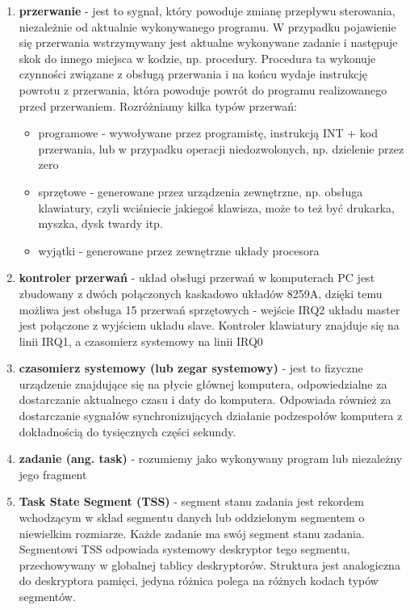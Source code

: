 \documentclass[a4paper,12pt]{article}
\begin{document}
\begin{enumerate}
	\item{\textbf{przerwanie} - jest to sygnał, który powoduje zmianę przepływu sterowania, niezależnie od aktualnie wykonywanego programu. W przypadku pojawienie się przerwania wstrzymywany jest aktualne wykonywane zadanie i następuje skok do innego miejsca w kodzie, np. procedury. Procedura ta wykonuje czynności związane z obsługą przerwania i na końcu wydaje instrukcję powrotu z przerwania, która powoduje powrót do programu realizowanego przed przerwaniem.
Rozróżniamy kilka typów przerwań:}
\begin{itemize}
\item{programowe - wywoływane przez programistę, instrukcją INT + kod przerwania, lub w przypadku operacji niedozwolonych, np. dzielenie przez zero}
\item{sprzętowe - generowane przez urządzenia zewnętrzne, np. obsługa klawiatury, czyli wciśniecie jakiegoś klawisza, może to też być drukarka, myszka, dysk twardy itp.}
\item{wyjątki - generowane przez zewnętrzne układy procesora}
\end{itemize}

\item{\textbf{kontroler przerwań} - układ obsługi przerwań w komputerach PC jest zbudowany z dwóch połączonych kaskadowo układów 8259A, dzięki temu możliwa jest obsługa 15 przerwań sprzętowych - wejście IRQ2 układu master jest połączone z wyjściem układu slave. Kontroler klawiatury znajduje się na linii IRQ1, a czasomierz systemowy na linii IRQ0}
				\item{\textbf{czasomierz systemowy (lub zegar systemowy)} - jest to fizyczne urządzenie znajdujące się na płycie głównej komputera, odpowiedzialne za dostarczanie aktualnego czasu i daty do komputera. Odpowiada również za dostarczanie sygnałów synchronizujących działanie podzespołów komputera z dokładnością do tysięcznych części sekundy.}

\item{\textbf{zadanie (ang. task)} - rozumiemy jako wykonywany program lub niezależny jego fragment }

\item{\textbf{Task State Segment (TSS) } - segment stanu zadania jest rekordem wchodzącym w skład segmentu danych lub oddzielonym segmentem o niewielkim rozmiarze. Każde zadanie ma swój segment stanu zadania. Segmentowi TSS odpowiada systemowy deskryptor tego segmentu, przechowywany w globalnej tablicy deskryptorów. Struktura jest analogiczna do deskryptora pamięci, jedyna różnica polega na różnych kodach typów segmentów. }
			
\end{enumerate}
\end{document}
